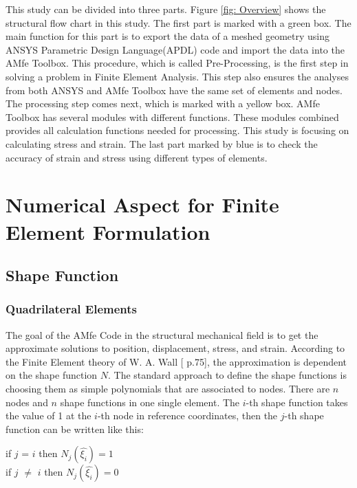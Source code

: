This study can be divided into three parts.  Figure \ref{fig: Overview} shows the structural flow chart in this study. The first part is marked with a green box. The main function for this part is to export the data of a meshed geometry using ANSYS Parametric Design Language(APDL) code and import the data into the AMfe Toolbox. This procedure, which is called Pre-Processing, is the first step in solving a problem in Finite Element Analysis. This step also ensures the analyses from both ANSYS and AMfe Toolbox have the same set of elements and nodes. The processing step comes next, which is marked with a yellow box. AMfe Toolbox has several modules with different functions. These modules combined provides all calculation functions needed for processing. This study is focusing on calculating stress and strain. The last part marked by blue is to check the accuracy of strain and stress using different types of elements.

\chapter{Numerical Aspect for Finite Element Formulation}
\section{Shape Function}
\subsection{Quadrilateral Elements}
The goal of the AMfe Code in the structural mechanical field is to get the approximate solutions to position, displacement, stress, and strain. According to the Finite Element theory of W. A. Wall [\cite{FiniteElement} p.75], the approximation is dependent on the shape function $N$. The standard approach to define the shape functions is choosing them as simple polynomials that are associated to nodes. There are $n$ nodes and $n$ shape functions in one single element. The $i$-th shape function takes the value of 1 at the $i$-th node in reference coordinates, then the $j$-th shape function can be written like this: \\

\begin{center}
	if $j$ = $i$ then $N_j\left(\hat{\xi_i}\right) = 1$ \\
	if $j$ $\neq$ $i$ then $N_j\left(\hat{\xi_i}\right) = 0$
\end{center}



